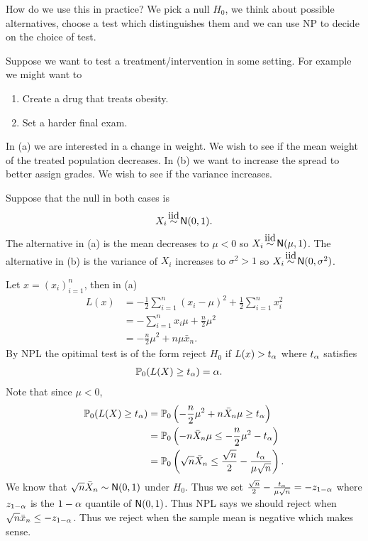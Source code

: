 How do we use this in practice? We pick a null $H_0$, we think about possible alternatives, choose a test which distinguishes them and we can use NP to decide on the choice of test.
\begin{ex}
    Suppose we want to test a treatment/intervention in some setting. For example we might want to
    \begin{enumerate}
        \item Create a drug that treats obesity.
        \item Set a harder final exam.
    \end{enumerate}
    In (a) we are interested in a change in weight. We wish to see if the mean weight of the treated population decreases. In (b) we want to increase the spread to better assign grades. We wish to see if the variance increases. 

    Suppose that the null in both cases is
    \[X_i \iid \Na(0,1). \]
    The alternative in (a) is the mean decreases to $\mu <0$ so $X_i \iid \Na(\mu,1)$. The alternative in (b) is the variance of $X_i$ increases to $\sigma^2 >1$ so $X_i \iid \Na(0,\sigma^2)$.

    Let $x=(x_i)_{i=1}^n$, then in (a)
    \begin{align*}
        L(x)& = -\frac{1}{2}\sum_{i=1}^n(x_i-\mu)^2 +\frac{1}{2}\sum_{i=1}^n x_i^2\\
            & = -\sum_{i=1}^n x_i \mu + \frac{n}{2}\mu^2\\
            &= -\frac{n}{2}\mu^2 + n \mu \bar{x}_n.
    \end{align*}
    By NPL the opitimal test is of the form reject $H_0$ if $L(x) > t_{\alpha}$ where $t_{\alpha}$ satisfies
    \begin{align*}
        {\mathbb{P}}_0(L(X) \ge t_{\alpha}) &={\alpha}.
    \end{align*}
    Note that since $\mu < 0$,
    \begin{align*}
        {\mathbb{P}}_0(L(X) \ge t_{\alpha}) &={\mathbb{P}}_0\left(-\frac{n}{2}\mu^2+n\bar{X}_n \mu \ge t_{\alpha} \right)\\
        &={\mathbb{P}}_0\left(-n\bar{X}_n \mu \le -\frac{n}{2}\mu^2-t_{\alpha} \right)\\
        &={\mathbb{P}}_0\left(\sqrt{n}\bar{X}_n \le \frac{\sqrt{n}}{2}-\frac{t_{\alpha}}{\mu\sqrt{n}}\right).
    \end{align*}
    We know that $\sqrt{n}\bar{X}_n \sim {\mathsf{N}}(0,1)$ under $H_0$. Thus we set $\frac{\sqrt{n}}{2}-\frac{t_{\alpha}}{\mu\sqrt{n}} = -z_{1-{\alpha}}$ where $z_{1-{\alpha}}$ is the $1-{\alpha}$ quantile of ${\mathsf{N}}(0,1)$. Thus NPL says we should reject when $\sqrt{n} \bar{x}_n \le - z_{1-{\alpha}}$. Thus we reject when the sample mean is negative which makes sense.


\end{ex}
